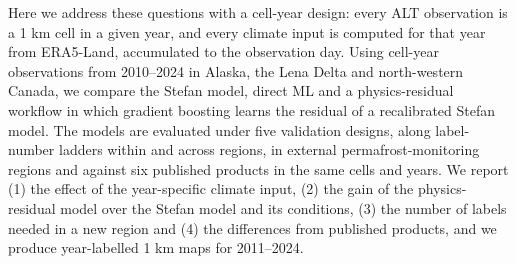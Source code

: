 Here we address these questions with a cell-year design: every ALT observation is a 1 km cell in a given year, and every climate input is computed for that year from ERA5-Land, accumulated to the observation day\cite{munozsabater2021_era5_land}. Using \nncyAll{} cell-year observations from 2010--2024 in Alaska, the Lena Delta and north-western Canada, we compare the Stefan model, direct ML and a physics-residual workflow in which gradient boosting learns the residual of a recalibrated Stefan model. The models are evaluated under five validation designs, along label-number ladders within and across regions, in external permafrost-monitoring regions and against six published products in the same cells and years. We report (1) the effect of the year-specific climate input, (2) the gain of the physics-residual model over the Stefan model and its conditions, (3) the number of labels needed in a new region and (4) the differences from published products, and we produce year-labelled 1 km maps for 2011--2024.
